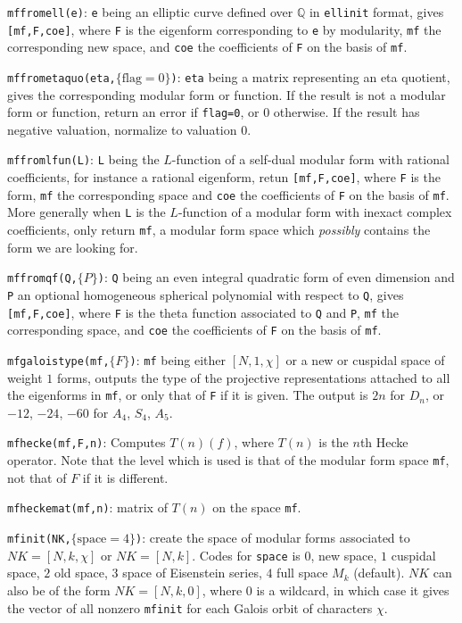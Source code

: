 \documentclass[11pt]{article}
\newcommand{\Q}{{\mathbb Q}}
\def\kbd#1{{\tt #1}}
\begin{document}
\f\kbd{mffromell(e)}: \kbd{e} being an elliptic curve defined over $\Q$ in
\kbd{ellinit} format, gives \kbd{[mf,F,coe]}, where \kbd{F} is the eigenform
corresponding to \kbd{e} by modularity, \kbd{mf} the corresponding new space,
and \kbd{coe} the coefficients of \kbd{F} on the basis of \kbd{mf}.

\f\kbd{mffrometaquo(eta,$\{\text{flag}=0\}$)}: \kbd{eta} being a matrix
representing an eta quotient, gives the corresponding modular form or
function. If the result is not a modular form or function, return an error if
\kbd{flag=0}, or $0$ otherwise. If the result has negative valuation,
normalize to valuation $0$.

\f\kbd{mffromlfun(L)}: \kbd{L} being the $L$-function of a self-dual
modular form with rational coefficients, for instance a rational eigenform,
retun \kbd{[mf,F,coe]}, where \kbd{F} is the form, \kbd{mf} the corresponding
space and \kbd{coe} the coefficients of \kbd{F} on the basis of \kbd{mf}.
More generally when \kbd{L} is the $L$-function of a modular form with
inexact complex coefficients, only return \kbd{mf}, a modular form space
which \emph{possibly} contains the form we are looking for.

\f\kbd{mffromqf(Q,$\{P\}$)}: \kbd{Q} being an even integral quadratic form of
even dimension and \kbd{P} an optional homogeneous spherical polynomial with
respect to \kbd{Q}, gives \kbd{[mf,F,coe]}, where \kbd{F} is the theta
function associated to \kbd{Q} and \kbd{P}, \kbd{mf} the corresponding space,
and \kbd{coe} the coefficients of \kbd{F} on the basis of \kbd{mf}.

\f\kbd{mfgaloistype(mf,$\{F\}$)}: \kbd{mf} being either $[N,1,\chi]$ or
a new or cuspidal space of weight $1$ forms, outputs the type of the projective
representations attached to all the eigenforms in \kbd{mf}, or only that of
\kbd{F} if it is given. The output is $2n$ for $D_n$, or $-12$, $-24$, $-60$
for $A_4$, $S_4$, $A_5$.

\f\kbd{mfhecke(mf,F,n)}: Computes $T(n)(f)$, where $T(n)$ is the $n$th Hecke
operator. Note that the level which is used is that of the modular form space
\kbd{mf}, not that of $F$ if it is different.

\f\kbd{mfheckemat(mf,n)}: matrix of $T(n)$ on the space \kbd{mf}.

\f\kbd{mfinit(NK,$\{\text{space}=4\}$)}: create the space of modular forms
associated to $NK=[N,k,\chi]$ or $NK=[N,k]$. Codes for \kbd{space} is $0$,
new space, $1$ cuspidal space, $2$ old space, $3$ space of Eisenstein series,
$4$ full space $M_k$ (default). $NK$ can also be of the form $NK=[N,k,0]$,
where $0$ is a wildcard, in which case it gives the vector of all nonzero
\kbd{mfinit} for each Galois orbit of characters $\chi$.
\end{document}
